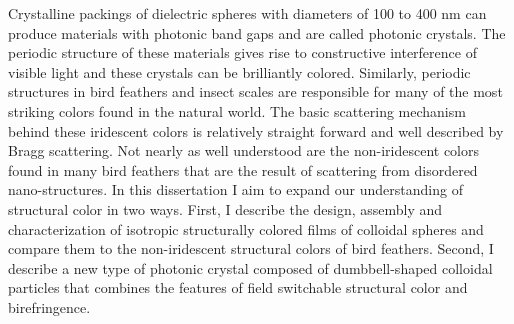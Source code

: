 Crystalline packings of dielectric spheres with diameters of 100 to 400 nm can produce materials with photonic band gaps and are called photonic crystals.
The periodic structure of these materials gives rise to constructive interference of visible light and these crystals can be brilliantly colored.
Similarly, periodic structures in bird feathers and insect scales are responsible for many of the most striking colors found in the natural world.
The basic scattering mechanism behind these iridescent colors is relatively straight forward and well described by Bragg scattering.
Not nearly as well understood are the non-iridescent colors found in many bird feathers that are the result of scattering from disordered nano-structures.
In this dissertation I aim to expand our understanding of structural color in two ways.
First, I describe the design, assembly and characterization of isotropic structurally colored films of colloidal spheres and compare them to the non-iridescent structural colors of bird feathers.
Second, I describe a new type of photonic crystal composed of dumbbell-shaped colloidal particles that combines the features of field switchable structural color and birefringence. 